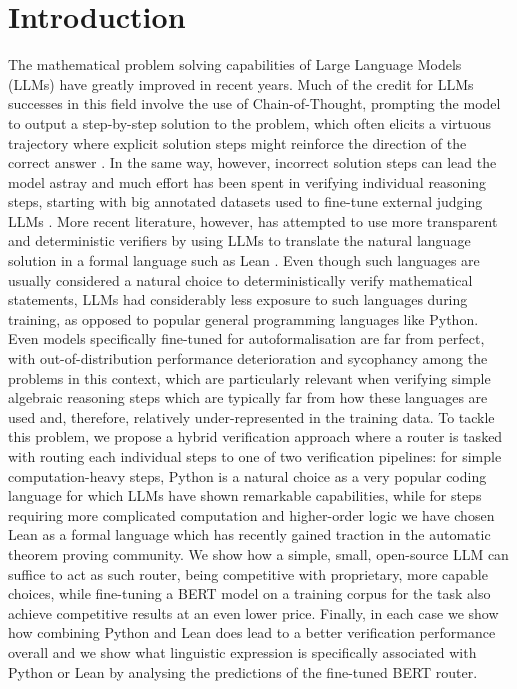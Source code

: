 \section{Introduction}
The mathematical problem solving capabilities of Large Language Models (LLMs) have greatly improved in recent years. Much of the credit for LLMs successes in this field involve the use of Chain-of-Thought, prompting the model to output a step-by-step solution to the problem, which often elicits a virtuous trajectory where explicit solution steps might reinforce the direction of the correct answer \cite{chain-of-thought}. In the same way, however, incorrect solution steps can lead the model astray and much effort has been spent in verifying individual reasoning steps, starting with big annotated datasets used to fine-tune external judging LLMs \cite{lightman2023lets}. More recent literature, however, has attempted to use more transparent and deterministic verifiers by using LLMs to translate the natural language solution in a formal language such as Lean \cite{safe2025, stepwise2025}. Even though such languages are usually considered a natural choice to deterministically verify mathematical statements, LLMs had considerably less exposure to such languages during training, as opposed to popular general programming languages like Python. Even models specifically fine-tuned for autoformalisation are far from perfect, with out-of-distribution performance deterioration \cite{putnambench2024} and sycophancy \cite{cornish2026faithformbenchbenchmarkingfaithfulnessmathematical} among the problems in this context, which are particularly relevant when verifying simple algebraic reasoning steps which are typically far from how these languages are used and, therefore, relatively under-represented in the training data. To tackle this problem, we propose a hybrid verification approach where a router is tasked with routing each individual steps to one of two verification pipelines: for simple computation-heavy steps, Python is a natural choice as a very popular coding language for which LLMs have shown remarkable capabilities, while for steps requiring more complicated computation and higher-order logic we have chosen Lean as a formal language which has recently gained traction in the automatic theorem proving community. We show how a simple, small, open-source LLM can suffice to act as such router, being competitive with proprietary, more capable choices, while fine-tuning a BERT model \cite{devlin-etal-2019-bert} on a training corpus for the task also achieve competitive results at an even lower price. Finally, in each case we show how combining Python and Lean does lead to a better verification performance overall and we show what linguistic expression is specifically associated with Python or Lean by analysing the predictions of the fine-tuned BERT router.
